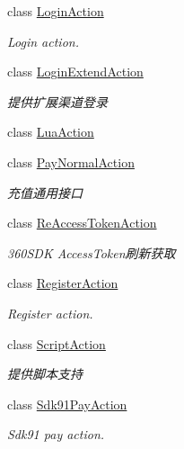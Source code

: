 \begin{DoxyCompactItemize}
\item 
class \mbox{\hyperlink{class_t_net_1_1_contract_1_1_action_1_1_login_action}{Login\+Action}}
\begin{DoxyCompactList}\small\item\em Login action. \end{DoxyCompactList}\item 
class \mbox{\hyperlink{class_t_net_1_1_contract_1_1_action_1_1_login_extend_action}{Login\+Extend\+Action}}
\begin{DoxyCompactList}\small\item\em 提供扩展渠道登录 \end{DoxyCompactList}\item 
class \mbox{\hyperlink{class_t_net_1_1_contract_1_1_action_1_1_lua_action}{Lua\+Action}}
\item 
class \mbox{\hyperlink{class_t_net_1_1_contract_1_1_action_1_1_pay_normal_action}{Pay\+Normal\+Action}}
\begin{DoxyCompactList}\small\item\em 充值通用接口 \end{DoxyCompactList}\item 
class \mbox{\hyperlink{class_t_net_1_1_contract_1_1_action_1_1_re_access_token_action}{Re\+Access\+Token\+Action}}
\begin{DoxyCompactList}\small\item\em 360\+S\+DK Access\+Token刷新获取 \end{DoxyCompactList}\item 
class \mbox{\hyperlink{class_t_net_1_1_contract_1_1_action_1_1_register_action}{Register\+Action}}
\begin{DoxyCompactList}\small\item\em Register action. \end{DoxyCompactList}\item 
class \mbox{\hyperlink{class_t_net_1_1_contract_1_1_action_1_1_script_action}{Script\+Action}}
\begin{DoxyCompactList}\small\item\em 提供脚本支持 \end{DoxyCompactList}\item 
class \mbox{\hyperlink{class_t_net_1_1_contract_1_1_action_1_1_sdk91_pay_action}{Sdk91\+Pay\+Action}}
\begin{DoxyCompactList}\small\item\em Sdk91 pay action. \end{DoxyCompactList}\end{DoxyCompactItemize}
